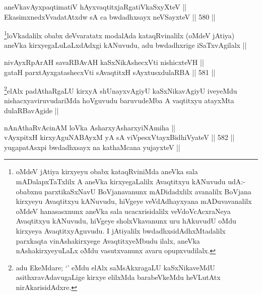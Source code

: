 
\begin{shl}
aneVkavAyxpaqtimatiV hAyxvaqtitxjaRgatiVkaSxyXteV || \\
EkasimxnedxVvadatAtxdw sA ca bwdadhxsayx neVSayxteV ||  580 ||  
\end{shl}

\begin{artha}
\footnote{oMdeV jAtiya kirxyeyu obabx kataqRviniMda aneVka sala mADalapxTaTxlilx A aneVka kirxyegaLalilx Avaqtitxyu kANuvudu udA:- obabxnu parxtikaSxNavU BoVjanavanunx mADidadxlilx avanalilx BoVjana kirxyeyu Avaqtitxyu kANuvudu, hiVgeye veVdAdhayxyana mADuvavanalilx oMdeV hanasasxnunx aneVka sala ucacxrisidalilx veVdoVcAcxraNeya Avaqtitxyu kANuvudu, hiVgeye sholxVkavanunx uru hAkuvudU oMdu kirxyeya AvaqtitxyAguvudu. I jAtiyalilx bwdadhxsidAdhxMtadalilx parxkaqta vinAshakirxyege AvaqtitxyeMbudu ilalx, aneVka nAshakirxyeyuLaLx oMdu vasutxvanunx avaru opupxvudilalx.}loVkadalilx obabx deVvaratatx modalAda kataqRvinalilx (oMdeV jAtiya) aneVka kirxyegaLuLaLxdAdxgi kANuvudu, adu bwdadhxrige iSaTxvAgilalx ||
\end{artha}

\begin{shl}
nivAyxRpArAH savaRBAvAH kaSxNikAshecxVti nishicxteVH || \\
gataH parxtAyxgatashecxVti sA\s \s vaqtitxH sAyxtusxdulaRBA ||  581 ||  
\end{shl}

\begin{artha}
\footnote{adu EkeMdare; `\stext' eMdu elAlx saMsAkxragaLU kaSxNikaveMdU asithxravAdavugaLige kirxye elilxMda barabeVkeMdu heVLutAtx nirAkarisidAdxre.}elAlx padAthaRgaLU kirxyA shUnayxvAgiyU kaSxNikavAgiyU iveyeMdu nishacxyaviruvudariMda hoVguvudu baruvudeMba A vaqtitxyu atayxMta dulaRBavAgide ||
\end{artha}


\begin{shl}
nAnAthaRvAcinAM loVka AsharxyAsharxyiNAmiha || \\
vAyxpitxH kirxyAguNABAyxM yA sA viVpesxVtayxBidhiVyateV ||  582 ||  
yugapatAsx\s pi bwdadhxsayx na kathaMcana yujayxteV ||  \\
\end{shl}

